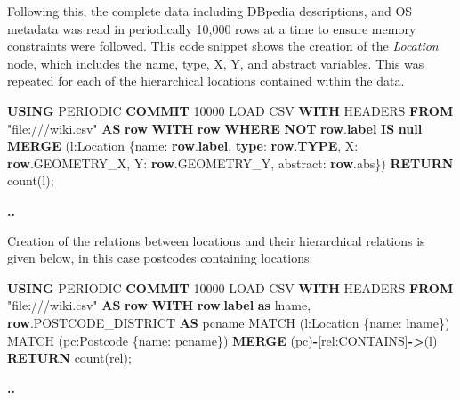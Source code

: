 \documentclass[10pt,]{article}
\renewcommand\texttt[1]{{\ttfamily\color{ttcolor}#1}}
\newenvironment{Shaded}{\begin{snugshade}}{\end{snugshade}}
\newcommand{\CharTok}[1]{\textcolor[rgb]{0.31,0.60,0.02}{#1}}
\newcommand{\DecValTok}[1]{\textcolor[rgb]{0.00,0.00,0.81}{#1}}
\newcommand{\FunctionTok}[1]{\textcolor[rgb]{0.00,0.00,0.00}{#1}}
\newcommand{\KeywordTok}[1]{\textcolor[rgb]{0.13,0.29,0.53}{\textbf{#1}}}
\newcommand{\NormalTok}[1]{#1}
\newcommand{\OperatorTok}[1]{\textcolor[rgb]{0.81,0.36,0.00}{\textbf{#1}}}
\newcommand{\OtherTok}[1]{\textcolor[rgb]{0.56,0.35,0.01}{#1}}
\begin{document}
Following this, the complete data including DBpedia descriptions, and OS
metadata was read in periodically 10,000 rows at a time to ensure memory
constraints were followed. This code snippet shows the creation of the
\emph{Location} node, which includes the \texttt{name}, \texttt{type},
\texttt{X}, \texttt{Y}, and \texttt{abstract} variables. This was
repeated for each of the hierarchical locations contained within the
data.

\vspace{2mm}

\begin{Shaded}
\begin{Highlighting}[]
\KeywordTok{USING}\NormalTok{ PERIODIC }\KeywordTok{COMMIT} \DecValTok{10000}
\NormalTok{LOAD CSV }\KeywordTok{WITH}\NormalTok{ HEADERS }\KeywordTok{FROM} \OtherTok{"file:///wiki.csv"} \KeywordTok{AS} \KeywordTok{row}
\KeywordTok{WITH} \KeywordTok{row} \KeywordTok{WHERE} \KeywordTok{NOT} \KeywordTok{row}\NormalTok{.}\KeywordTok{label} \KeywordTok{IS} \KeywordTok{null}
\KeywordTok{MERGE}\NormalTok{ (l}\CharTok{:Location}\NormalTok{ \{name: }\KeywordTok{row}\NormalTok{.}\KeywordTok{label}\NormalTok{,}
                   \KeywordTok{type}\NormalTok{: }\KeywordTok{row}\NormalTok{.}\KeywordTok{TYPE}\NormalTok{,}
\NormalTok{                   X: }\KeywordTok{row}\NormalTok{.GEOMETRY\_X,}
\NormalTok{                   Y: }\KeywordTok{row}\NormalTok{.GEOMETRY\_Y,}
\NormalTok{                   abstract: }\KeywordTok{row}\NormalTok{.}\FunctionTok{abs}\NormalTok{\})}
\KeywordTok{RETURN} \FunctionTok{count}\NormalTok{(l);}

\OperatorTok{..}
\end{Highlighting}
\end{Shaded}

Creation of the relations between locations and their hierarchical
relations is given below, in this case postcodes containing locations:

\vspace{2mm}

\begin{Shaded}
\begin{Highlighting}[]
\KeywordTok{USING}\NormalTok{ PERIODIC }\KeywordTok{COMMIT} \DecValTok{10000}
\NormalTok{LOAD CSV }\KeywordTok{WITH}\NormalTok{ HEADERS }\KeywordTok{FROM} \OtherTok{"file:///wiki.csv"} \KeywordTok{AS} \KeywordTok{row}
\KeywordTok{WITH} \KeywordTok{row}\NormalTok{.}\KeywordTok{label} \KeywordTok{as}\NormalTok{ lname, }\KeywordTok{row}\NormalTok{.POSTCODE\_DISTRICT }\KeywordTok{AS}\NormalTok{ pcname}
\NormalTok{MATCH (l}\CharTok{:Location}\NormalTok{ \{name: lname\})}
\NormalTok{MATCH (pc}\CharTok{:Postcode}\NormalTok{ \{name: pcname\})}
\KeywordTok{MERGE}\NormalTok{ (pc)}\OperatorTok{{-}}\NormalTok{[rel}\CharTok{:CONTAINS}\NormalTok{]}\OperatorTok{{-}\textgreater{}}\NormalTok{(l)}
\KeywordTok{RETURN} \FunctionTok{count}\NormalTok{(rel);}

\OperatorTok{..}
\end{Highlighting}
\end{Shaded}
\end{document}
